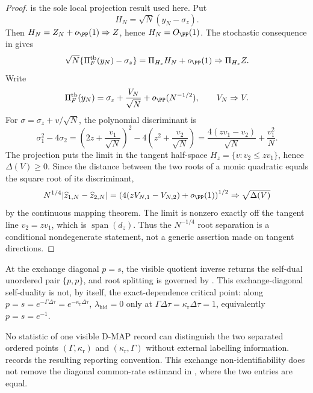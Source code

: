 \begin{proof}
 is the sole local
projection result used here.  Put
\[
H_N=\sqrt N(y_N-\sigma_z).
\]
Then \(H_N=Z_N+o_{\PP}(1)\Rightarrow Z\), hence \(H_N=O_{\PP}(1)\).  The
stochastic consequence in
 gives
\[
\sqrt N\{\Pi_F^{\rm tb}(y_N)-\sigma_z\}
=\Pi_{H_z}H_N+o_{\PP}(1)\Rightarrow\Pi_{H_z}Z .
\]
Write
\[
\Pi_F^{\rm tb}(y_N)=\sigma_z+\frac{V_N}{\sqrt N}+o_{\PP}(N^{-1/2}),
\qquad V_N\Rightarrow V .
\]
For \(\sigma=\sigma_z+v/\sqrt N\), the polynomial discriminant is
\[
\sigma_1^2-4\sigma_2
=\left(2z+\frac{v_1}{\sqrt N}\right)^2
 -4\left(z^2+\frac{v_2}{\sqrt N}\right)
=\frac{4(zv_1-v_2)}{\sqrt N}+\frac{v_1^2}{N}.
\]
The projection puts the limit in the tangent half-space
\(H_z=\{v:v_2\le zv_1\}\), hence \(\Delta(V)\ge0\).  Since the
distance between the two roots of a monic quadratic equals the square root of
its discriminant,
\[
N^{1/4}|\widehat z_{1,N}-\widehat z_{2,N}|
=\left(4(zV_{N,1}-V_{N,2})+o_{\PP}(1)\right)^{1/2}
\Rightarrow \sqrt{\Delta(V)}
\]
by the continuous mapping theorem.  The limit is nonzero exactly off the
tangent line \(v_2=zv_1\), which is
\(\operatorname{span}(d_z)\).  Thus the \(N^{-1/4}\) root separation is a
conditional nondegenerate statement, not a generic assertion made on tangent
directions.
\end{proof}

\begin{corollary}\label{cor:critical_self_dual_inverse}
At the exchange diagonal \(p=s\), the visible quotient inverse returns the
self-dual unordered pair \(\{p,p\}\), and root splitting is governed by
.  This exchange-diagonal
self-duality is not, by itself, the exact-dependence critical point: along
\(p=s=e^{-\Gamma\Delta\tau}=e^{-\kappa_{\mathrm r}\Delta\tau}\),
\(\lambda_{\mathrm{hid}}=0\) only at
\(\Gamma\Delta\tau=\kappa_{\mathrm r}\Delta\tau=1\), equivalently
\(p=s=e^{-1}\).
\end{corollary}

\begin{proposition}\label{prop:hidden_label_exchange_nonidentifiability}
No statistic of one visible D-MAP record can distinguish the two separated
ordered points \((\Gamma,\kappa_{\mathrm r})\) and
\((\kappa_{\mathrm r},\Gamma)\) without external labelling information.
 records the resulting reporting
convention.  This exchange
non-identifiability does not remove the diagonal common-rate estimand in
, where the two entries are equal.
\end{proposition}

